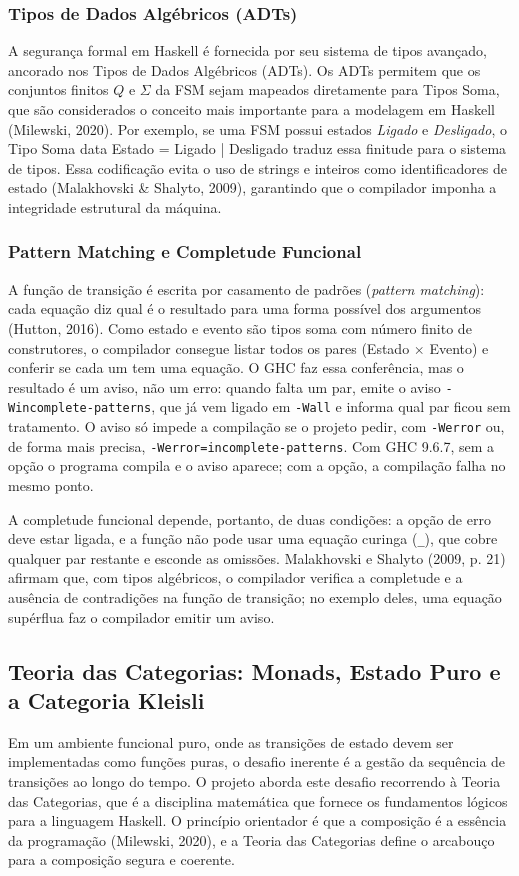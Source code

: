 \documentclass[12pt,a4paper]{article}
\begin{document}
\subsubsection{Tipos de Dados Algébricos (ADTs)}
A segurança formal em Haskell é fornecida por seu sistema de tipos avançado, ancorado nos Tipos de Dados Algébricos (ADTs). Os ADTs permitem que os conjuntos finitos $Q$ e $\Sigma$ da FSM sejam mapeados diretamente para Tipos Soma, que são considerados o conceito mais importante para a modelagem em Haskell (Milewski, 2020). Por exemplo, se uma FSM possui estados \textit{Ligado} e \textit{Desligado}, o Tipo Soma data Estado = Ligado | Desligado traduz essa finitude para o sistema de tipos. Essa codificação evita o uso de strings e inteiros como identificadores de estado (Malakhovski \& Shalyto, 2009), garantindo que o compilador imponha a integridade estrutural da máquina.

\subsubsection{Pattern Matching e Completude Funcional}
A função de transição é escrita por casamento de padrões (\textit{pattern matching}): cada equação diz qual é o resultado para uma forma possível dos argumentos (Hutton, 2016). Como estado e evento são tipos soma com número finito de construtores, o compilador consegue listar todos os pares (Estado $\times$ Evento) e conferir se cada um tem uma equação. O GHC faz essa conferência, mas o resultado é um aviso, não um erro: quando falta um par, emite o aviso \texttt{-Wincomplete-patterns}, que já vem ligado em \texttt{-Wall} e informa qual par ficou sem tratamento. O aviso só impede a compilação se o projeto pedir, com \texttt{-Werror} ou, de forma mais precisa, \texttt{-Werror=incomplete-patterns}. Com GHC 9.6.7, sem a opção o programa compila e o aviso aparece; com a opção, a compilação falha no mesmo ponto.

A completude funcional depende, portanto, de duas condições: a opção de erro deve estar ligada, e a função não pode usar uma equação curinga (\texttt{\_}), que cobre qualquer par restante e esconde as omissões. Malakhovski e Shalyto (2009, p. 21) afirmam que, com tipos algébricos, o compilador verifica a completude e a ausência de contradições na função de transição; no exemplo deles, uma equação supérflua faz o compilador emitir um aviso.

\subsection{Teoria das Categorias: Monads, Estado Puro e a Categoria Kleisli}
Em um ambiente funcional puro, onde as transições de estado devem ser implementadas como funções puras, o desafio inerente é a gestão da sequência de transições ao longo do tempo. O projeto aborda este desafio recorrendo à Teoria das Categorias, que é a disciplina matemática que fornece os fundamentos lógicos para a linguagem Haskell. O princípio orientador é que a composição é a essência da programação (Milewski, 2020), e a Teoria das Categorias define o arcabouço para a composição segura e coerente.
\end{document}
